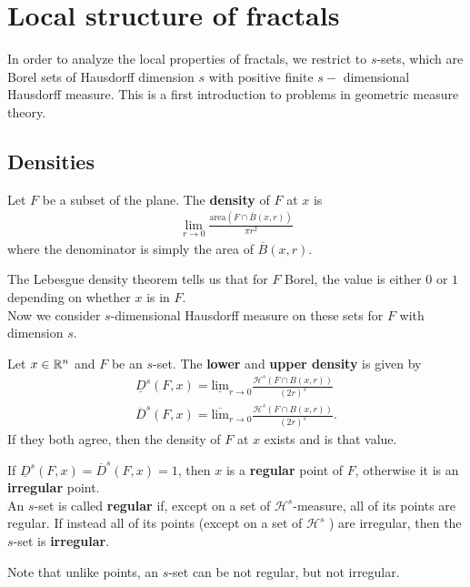 \documentclass{memoir}
\begin{document}


\chapter{Local structure of fractals}
\label{cha:local_structure_of_fractals}

In order to analyze the local properties of fractals, we restrict to \(s\)-sets, which are Borel sets of Hausdorff dimension \(s\) with positive finite \(s-\) dimensional Hausdorff measure. This is a first introduction to problems in geometric measure theory.

\section{Densities}
\label{sec:densities}

\begin{defn}[Density]
	Let \(F\) be a subset of the plane. The \textbf{density} of \(F\) at \(x\) is
	\begin{align*}
		\lim_{r \to 0} \frac{\textrm{area}(F\cap \overline{B}(x,r))}{\pi r^2}
	\end{align*}
	where the denominator is simply the area of \(\overline{B}(x,r)\).
\end{defn}
The Lebesgue density theorem tells us that for \(F\) Borel, the value is either \(0\) or \(1\) depending on whether \(x\) is in \(F\).\\

Now we consider \(s\)-dimensional Hausdorff measure on these sets for \(F\) with dimension \(s\).
\begin{defn}
	Let \(x \in \mathbb{R}^{n}\) and \(F\) be an \(s\)-set. The \textbf{lower} and \textbf{upper density} is given by
	\begin{align*}
		\underline{D}^{s}(F,x) = \underline{\textrm{lim}}_{r\to 0} \frac{\mathcal{H}^{s}(F\cap B(x,r))}{(2r)^{s}}\\
		\overline{D}^{s}(F,x) = \overline{\textrm{lim}}_{r\to 0} \frac{\mathcal{H}^{s}(F\cap B(x,r))}{(2r)^{s}}.
	\end{align*}
	If they both agree, then the density of \(F\) at \(x\) exists and is that value.
\end{defn}

\begin{defn}
	If \(\underline{D}^{s}(F,x) = \overline{D}^{s}(F,x) = 1\), then \(x\) is a \textbf{regular} point of \(F\), otherwise it is an \textbf{irregular} point.\\

	An \(s\)-set is called \textbf{regular} if, except on a set of \(\mathcal{H}^{s}\)-measure, all of its points are regular. If instead all of its points (except on a set of \(\mathcal{H}^{s}\) ) are irregular, then the \(s\)-set is \textbf{irregular}.
\end{defn}
Note that unlike points, an \(s\)-set can be not regular, but not irregular.\\
\end{document}
